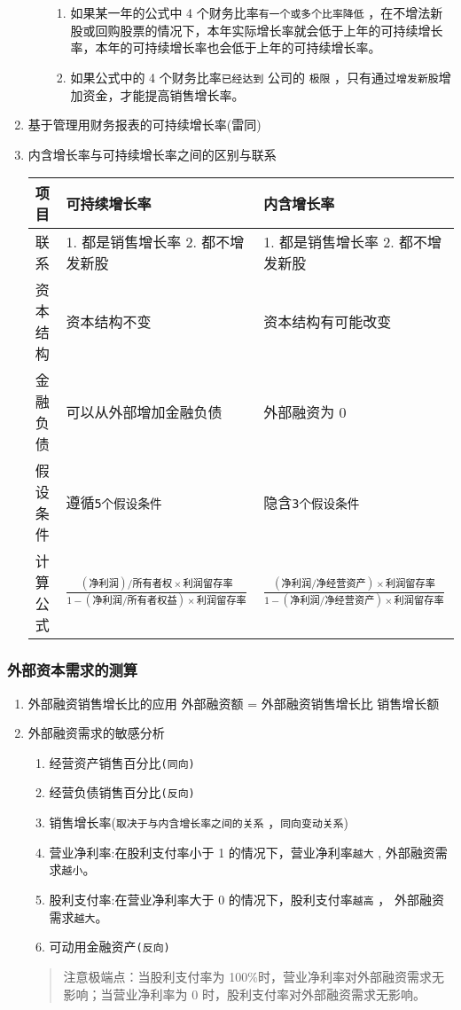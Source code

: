 \documentclass[11pt]{article}
\begin{document}
\begin{enumerate}
\begin{enumerate}
\begin{enumerate}
\item 如果某一年的公式中 4 个财务比率\texttt{有一个或多个比率降低} ，在不增法新股或回购股票的情况下，本年实际增长率就会低于上年的可持续增长率，本年的可持续增长率也会低于上年的可持续增长率。
\item 如果公式中的 4 个财务比率\texttt{已经达到} 公司的 \texttt{极限} ，只有通过\texttt{增发新股}增加资金，才能提高销售增长率。
\end{enumerate}
\end{enumerate}
\item 基于管理用财务报表的可持续增长率(雷同)
\label{sec:orgb4127fa}
\item 内含增长率与可持续增长率之间的区别与联系
\label{sec:orgbf610a8}
\begin{center}
\begin{tabular}{lll}
项目 & 可持续增长率 & 内含增长率\\
\hline
联系 & 1. 都是销售增长率 2. 都不增发新股 & 1. 都是销售增长率 2. 都不增发新股\\
资本结构 & 资本结构不变 & 资本结构有可能改变\\
金融负债 & 可以从外部增加金融负债 & 外部融资为 0\\
假设条件 & 遵循\texttt{5个假设条件} & 隐含\texttt{3个假设条件}\\
计算公式 & \(\frac{(净利润)/所有者权\times 利润留存率 }{1-(净利润/所有者权益)\times 利润留存率}\) & \(\frac{(净利润/净经营资产)\times 利润留存率}{1-(净利润/净经营资产)\times 利润留存率}\)\\
\end{tabular}
\end{center}
\end{enumerate}
\subsubsection{外部资本需求的测算}
\label{sec:orgd463711}
\begin{enumerate}
\item 外部融资销售增长比的应用
\label{sec:orgb83696b}
外部融资额 = 外部融资销售增长比 \texttimes{} 销售增长额
\item 外部融资需求的敏感分析
\label{sec:org7e629fc}
\begin{enumerate}
\item 经营资产销售百分比\texttt{(同向)}
\item 经营负债销售百分比\texttt{(反向)}
\item 销售增长率(\texttt{取决于与内含增长率之间的关系} ，\texttt{同向变动关系})
\item 营业净利率:在股利支付率小于 1 的情况下，营业净利率\texttt{越大} , 外部融资需求\texttt{越小}。
\item 股利支付率:在营业净利率大于 0 的情况下，股利支付率\texttt{越高} ， 外部融资需求\texttt{越大}。
\item 可动用金融资产\texttt{(反向)}
\end{enumerate}
\begin{quote}
注意极端点：当股利支付率为 100\%时，营业净利率对外部融资需求无影响；当营业净利率为 0 时，股利支付率对外部融资需求无影响。
\end{quote}
\end{enumerate}
\end{document}
